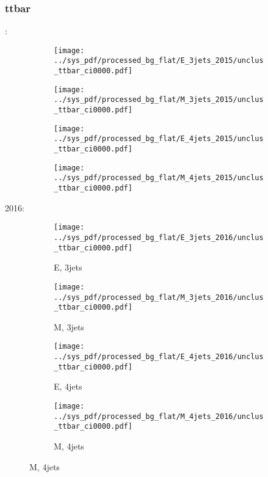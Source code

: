 \documentclass{beamer}
\begin{document}
\begin{frame}
\frametitle{ttbar}
\fontsize{5}{1}:
\begin{figure}
\centering
\begin{subfigure}[b]{0.24\textwidth}
\texttt{[image: ../sys\_pdf/processed\_bg\_flat/E\_3jets\_2015/unclus\_ttbar\_ci0000.pdf]}
\end{subfigure}
\begin{subfigure}[b]{0.24\textwidth}
\texttt{[image: ../sys\_pdf/processed\_bg\_flat/M\_3jets\_2015/unclus\_ttbar\_ci0000.pdf]}
\end{subfigure}
\begin{subfigure}[b]{0.24\textwidth}
\texttt{[image: ../sys\_pdf/processed\_bg\_flat/E\_4jets\_2015/unclus\_ttbar\_ci0000.pdf]}
\end{subfigure}
\begin{subfigure}[b]{0.24\textwidth}
\texttt{[image: ../sys\_pdf/processed\_bg\_flat/M\_4jets\_2015/unclus\_ttbar\_ci0000.pdf]}
\end{subfigure}
\end{figure}
2016:
\begin{figure}
\centering
\begin{subfigure}[b]{0.24\textwidth}
\texttt{[image: ../sys\_pdf/processed\_bg\_flat/E\_3jets\_2016/unclus\_ttbar\_ci0000.pdf]}
\captionsetup{font=tiny}
\caption{E, 3jets}
\end{subfigure}
\begin{subfigure}[b]{0.24\textwidth}
\texttt{[image: ../sys\_pdf/processed\_bg\_flat/M\_3jets\_2016/unclus\_ttbar\_ci0000.pdf]}
\captionsetup{font=tiny}
\caption{M, 3jets}
\end{subfigure}
\begin{subfigure}[b]{0.24\textwidth}
\texttt{[image: ../sys\_pdf/processed\_bg\_flat/E\_4jets\_2016/unclus\_ttbar\_ci0000.pdf]}
\captionsetup{font=tiny}
\caption{E, 4jets}
\end{subfigure}
\begin{subfigure}[b]{0.24\textwidth}
\texttt{[image: ../sys\_pdf/processed\_bg\_flat/M\_4jets\_2016/unclus\_ttbar\_ci0000.pdf]}
\captionsetup{font=tiny}
\caption{M, 4jets}
\end{subfigure}
\end{figure}
\end{frame}
\end{document}
